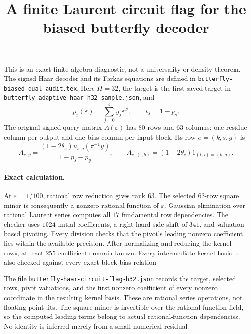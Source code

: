 \documentclass{article}
\begin{document}
\title{A finite Laurent circuit flag for the biased butterfly decoder}
\maketitle

This is an exact finite algebra diagnostic, not a universality or density theorem.
The signed Haar decoder and its Farkas equations are defined in
\texttt{butterfly-biased-dual-audit.tex}.  Here $H=32$, the target is the first
saved target in \texttt{butterfly-adaptive-haar-h32-sample.json}, and
\[
 p_y(\varepsilon)=\sum_{j=0}^{4}y_j\varepsilon^{2^j},\qquad
 t_s=1-p_s.
\]
The original signed query matrix $A(\varepsilon)$ has $80$ rows and $63$
columns: one residue column per output and one bias column per input block.
Its row $e=(k,s,g)$ is
\[
 A_{e,y}=\frac{(1-2\theta_e)u_{k,g}(\pi^{-1}y)}{1-p_s-p_y},\qquad
 A_{e,(l,b)}=(1-2\theta_e)1_{(l,b)=(k,g)}.
\]

\paragraph{Exact calculation.}
At $\varepsilon=1/100$, rational row reduction gives rank $63$.  The selected
$63$-row square minor is consequently a nonzero rational function of
$\varepsilon$.  Gaussian elimination over rational Laurent series computes
all $17$ fundamental row dependencies.  The checker uses $1024$ initial
coefficients, a right-hand-side shift of $341$, and valuation-based pivoting.
Every division checks that the pivot's leading nonzero coefficient lies
within the available precision.  After normalizing and reducing the kernel
rows, at least $255$ coefficients remain known.  Every intermediate kernel
basis is also checked against every exact block-bias relation.

The file \texttt{butterfly-haar-circuit-flag-h32.json} records the target,
selected rows, pivot valuations, and the first nonzero coefficient of every
nonzero coordinate in the resulting kernel basis.  These are rational
series operations, not floating point fits.  The square minor is invertible
over the rational-function field, so the computed leading terms belong to
actual rational-function dependencies.  No identity is inferred merely
from a small numerical residual.
\end{document}
